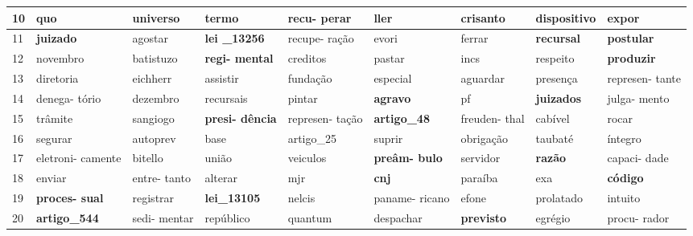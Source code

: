 \begin{table}
\begin{tabular}{|p{1cm}|p{1.5cm}|p{1.5cm}|p{1.5cm}|p{1.5cm}|p{1.5cm}|p{1.5cm}|p{1.5cm}|p{1.5cm}|}
    10 &  quo & universo & termo & \textbf{recu- \newline perar} & ller & crisanto & dispositivo & expor \\ \hline
    11 & \textbf{juizado} & agostar & \textbf{lei \newline \_13256} & recupe- \newline ração & evori & ferrar & \textbf{recursal} & \textbf{postular} \\ \hline
    12 &  novembro & batistuzo & \textbf{regi- \newline mental} & creditos & pastar & incs & respeito & \textbf{produzir} \\ \hline
    13 &  diretoria & eichherr & assistir & fundação & especial & aguardar & presença & represen- \newline tante \\ \hline
    14 &  denega- \newline tório & dezembro & recursais & pintar & \textbf{agravo} & pf & \textbf{juizados} & julga- \newline mento \\ \hline
    15 &  trâmite & sangiogo & \textbf{presi- \newline dência} & represen- \newline tação & \textbf{artigo\newline \_48} & freuden- \newline thal & cabível & rocar \\ \hline
    16 &  segurar & autoprev & base & artigo\newline\_25 & suprir & obrigação & taubaté & íntegro \\ \hline
    17 &  eletroni- \newline camente & bitello & união & veiculos & \textbf{preâm- \newline bulo} & servidor & \textbf{razão} & capaci- \newline dade \\ \hline
    18 &  enviar & entre- \newline tanto & alterar & mjr & \textbf{cnj} & paraíba & exa & \textbf{código} \\ \hline
    19 &  \textbf{proces- \newline sual} & registrar & \textbf{lei\newline\_13105} & nelcis & paname- \newline ricano & efone & prolatado & intuito \\ \hline
    20 &  \textbf{artigo\newline\_544} & sedi- \newline mentar & repúblico & quantum & despachar & \textbf{previsto} & egrégio & procu- \newline rador \\ \hline
  \end{tabular}
\end{table}